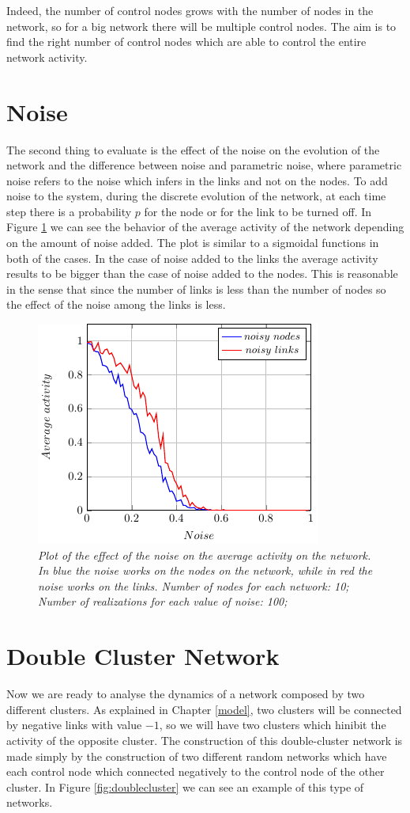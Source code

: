 Indeed, the number of control nodes grows with the number of nodes in the network, so for a big network there will be multiple control nodes. The aim is to find the right number of control nodes which are able to control the entire network activity.




\section{Noise}
The second thing to evaluate is the effect of the noise on the evolution of the network and the difference between noise and parametric noise, where parametric noise refers to the noise which infers in the links and not on the nodes.
To add noise to the system, during the discrete evolution of the network, at each time step there is a probability $p$ for the node or for the link to be turned off.
In Figure \ref{fig:noise} we can see the behavior of the average activity of the network depending on the amount of noise added. The plot is similar to a sigmoidal functions in both of the cases. In the case of noise added to the links the average activity results to be bigger than the case of noise added to the nodes. This is reasonable in the sense that since the number of links is less than the number of nodes so the effect of the noise among the links is less.
\begin{figure}[h]
\centering
\includegraphics[scale=1.5]{images/noise.pdf}
\caption{\emph{Plot of the effect of the noise on the average activity on the network. In blue the noise works on the nodes on the network, while in red the noise works on the links. Number of nodes for each network: 10; Number of realizations for each value of noise: 100; }}
\label{fig:noise}
\end{figure}

\section{Double Cluster Network}
Now we are ready to analyse the dynamics of a network composed by two different clusters. As explained in Chapter \ref{model}, two clusters will be connected by negative links with value $-1$, so we will have two clusters which hinibit the activity of the opposite cluster.
The construction of this double-cluster network is made simply by the construction of two different random networks which have each control node which connected negatively to the control node of the other cluster. In Figure \ref{fig:doublecluster} we can see an example of this type of networks.

